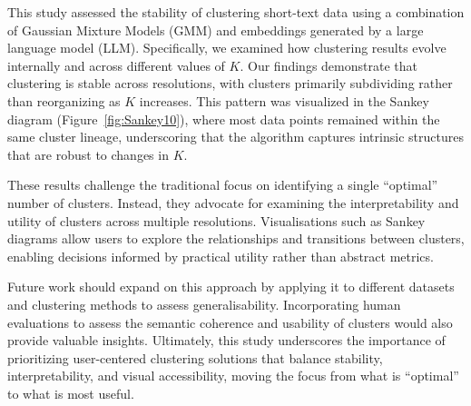 \documentclass{article}
\begin{document}
This study assessed the stability of clustering short-text data using a combination of Gaussian Mixture Models (GMM) and embeddings generated by a large language model (LLM). Specifically, we examined how clustering results evolve internally and across different values of $K$. Our findings demonstrate that clustering is stable across resolutions, with clusters primarily subdividing rather than reorganizing as $K$ increases. This pattern was visualized in the Sankey diagram (Figure~\ref{fig:Sankey10}), where most data points remained within the same cluster lineage, underscoring that the algorithm captures intrinsic structures that are robust to changes in $K$.

These results challenge the traditional focus on identifying a single ``optimal” number of clusters. Instead, they advocate for examining the interpretability and utility of clusters across multiple resolutions. Visualisations such as Sankey diagrams allow users to explore the relationships and transitions between clusters, enabling decisions informed by practical utility rather than abstract metrics.

Future work should expand on this approach by applying it to different datasets and clustering methods to assess generalisability. Incorporating human evaluations to assess the semantic coherence and usability of clusters would also provide valuable insights. Ultimately, this study underscores the importance of prioritizing user-centered clustering solutions that balance stability, interpretability, and visual accessibility, moving the focus from what is ``optimal” to what is most useful.









\end{document}
